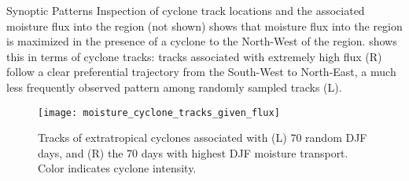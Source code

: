 \begin{block}{Synoptic Patterns}
    Inspection of cyclone track locations and the associated moisture flux into the region (not shown) shows that moisture flux into the region is maximized in the presence of a cyclone to the North-West of the region.
     shows this in terms of cyclone tracks: tracks associated with extremely high flux (R) follow a clear preferential trajectory from the South-West to North-East, a much less frequently observed pattern among randomly sampled tracks (L).
    \begin{figure}
        \texttt{[image: moisture\_cyclone\_tracks\_given\_flux]}
        \caption{Tracks of extratropical cyclones associated with (L) 70 random DJF days, and (R) the 70 days with highest DJF moisture transport. Color indicates cyclone intensity.}
        \label{fig:track-given-flux}
    \end{figure}
\end{block}

